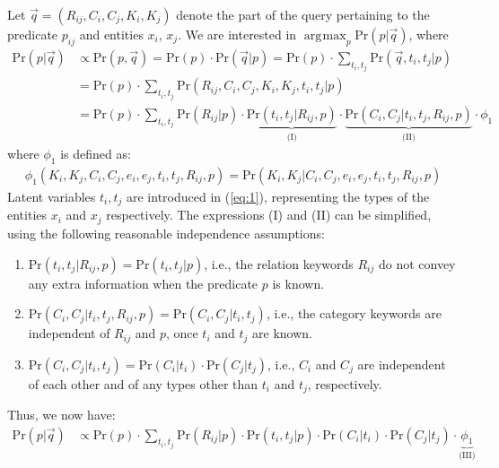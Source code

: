 \documentclass[a4paper, twoside, 12pt]{report}
\DeclareMathOperator*{\argmax}{arg\!\max}
\begin{document}
Let $\vec{q} = (R_{ij}, C_i, C_j, K_i, K_j)$ denote the part of the query pertaining to the predicate $p_{ij}$ and entities $x_i$, $x_j$. We are interested in $\argmax_{p}$Pr$(p|\vec{q})$, where
\begin{align}\label{eq:1}
\text{Pr}(p|\vec{q}) &\propto \text{Pr}(p, \vec{q}) = \text{Pr}(p)\cdot \text{Pr}(\vec{q}|p) = \text{Pr}(p)\cdot \sum_{t_{i}, t_{j}} \text{Pr}(\vec{q}, t_i, t_j | p) \\
&= \text{Pr}(p)\cdot \sum_{t_{i}, t_{j}} \text{Pr}(R_{ij}, C_i, C_j, K_i, K_j, t_i, t_j| p) \\
&= \text{Pr}(p)\cdot \sum_{t_{i}, t_{j}} \text{Pr}(R_{ij}|p)\cdot\underbrace{\text{Pr}(t_i,t_j|R_{ij},p)}_\text{(I)}\cdot\underbrace{\text{Pr}(C_i,C_j|t_i,t_j,R_{ij},p)}_\text{(II)}\cdot \phi_1 \label{eq:omphi1}
\end{align}
where $\phi_1$ is defined as:
\begin{align}
\phi_1(K_i,K_j,C_i,C_j,e_i,e_j,t_i,t_j,R_{ij},p) = \text{Pr}(K_i,K_j|C_i,C_j,e_i,e_j,t_i,t_j,R_{ij},p) \label{eq:phi1}
\end{align}
Latent variables $t_i, t_j$ are introduced in (\ref{eq:1}), representing the types of the entities $x_i$ and $x_j$ respectively. The expressions (I) and (II) can be simplified, using the following reasonable independence assumptions:

\begin{enumerate}
\item $\text{Pr}(t_i,t_j|R_{ij},p) = \text{Pr}(t_i,t_j|p)$, i.e., the relation keywords $R_{ij}$ do not convey any extra information when the predicate $p$ is known.

\item $\text{Pr}(C_i,C_j|t_i,t_j,R_{ij},p) = \text{Pr}(C_i,C_j|t_i,t_j)$, i.e., the category keywords are independent of $R_{ij}$ and $p$, once $t_i$ and $t_j$ are known.

\item $\text{Pr}(C_i,C_j|t_i,t_j) = \text{Pr}(C_i|t_i) \cdot \text{Pr}(C_j|t_j)$, i.e., $C_i$ and $C_j$ are independent of each other and of any types other than $t_i$ and $t_j$, respectively.  
\end{enumerate}

Thus, we now have:
\begin{align}
\text{Pr}(p|\vec{q}) &\propto \text{Pr}(p)\cdot \sum_{t_{i}, t_{j}} \text{Pr}(R_{ij}|p)\cdot \text{Pr}(t_i,t_j|p) \cdot \text{Pr}(C_i|t_i) \cdot \text{Pr}(C_j|t_j) \cdot \underbrace{\phi_1}_\text{(III)} \label{eq:main2}
\end{align}
\end{document}

